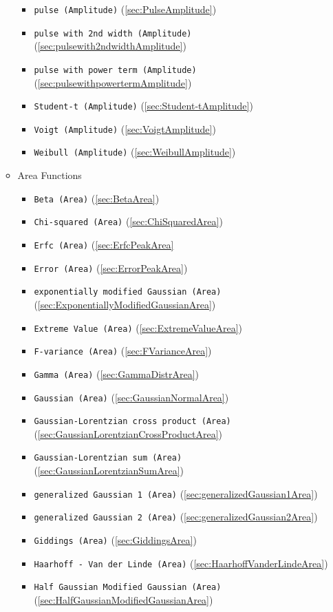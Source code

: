 \begin{itemize}
\begin{itemize}
\begin{itemize}
    \item \texttt{pulse (Amplitude)}  (\ref{sec:PulseAmplitude})
    \item \texttt{pulse with 2nd width (Amplitude)}  (\ref{sec:pulsewith2ndwidthAmplitude})
    \item \texttt{pulse with power term (Amplitude)}  (\ref{sec:pulsewithpowertermAmplitude})
    \item \texttt{Student-t (Amplitude)} (\ref{sec:Student-tAmplitude})
    \item \texttt{Voigt (Amplitude)} (\ref{sec:VoigtAmplitude})
    \item \texttt{Weibull (Amplitude)} (\ref{sec:WeibullAmplitude})
  \end{itemize}
  \item Area Functions
  \begin{itemize}
    \item \texttt{Beta (Area)} (\ref{sec:BetaArea})
    \item \texttt{Chi-squared (Area)} (\ref{sec:ChiSquaredArea})
    \item \texttt{Erfc (Area)} (\ref{sec:ErfcPeakArea}
    \item \texttt{Error (Area)} (\ref{sec:ErrorPeakArea})
    \item \texttt{exponentially modified Gaussian (Area)} (\ref{sec:ExponentiallyModifiedGaussianArea})
    \item \texttt{Extreme Value (Area)} (\ref{sec:ExtremeValueArea})
    \item \texttt{F-variance (Area)} (\ref{sec:FVarianceArea})
    \item \texttt{Gamma (Area)} (\ref{sec:GammaDistrArea})
    \item \texttt{Gaussian (Area)} (\ref{sec:GaussianNormalArea})
    \item \texttt{Gaussian-Lorentzian cross product (Area)} (\ref{sec:GaussianLorentzianCrossProductArea})
    \item \texttt{Gaussian-Lorentzian sum (Area)} (\ref{sec:GaussianLorentzianSumArea})
    \item \texttt{generalized Gaussian 1 (Area)} (\ref{sec:generalizedGaussian1Area})
    \item \texttt{generalized Gaussian 2 (Area)} (\ref{sec:generalizedGaussian2Area})
    \item \texttt{Giddings (Area)} (\ref{sec:GiddingsArea})
    \item \texttt{Haarhoff - Van der Linde (Area)} (\ref{sec:HaarhoffVanderLindeArea})
    \item \texttt{Half Gaussian Modified Gaussian (Area)} (\ref{sec:HalfGaussianModifiedGaussianArea})

\end{itemize}
\end{itemize}
\end{itemize}
